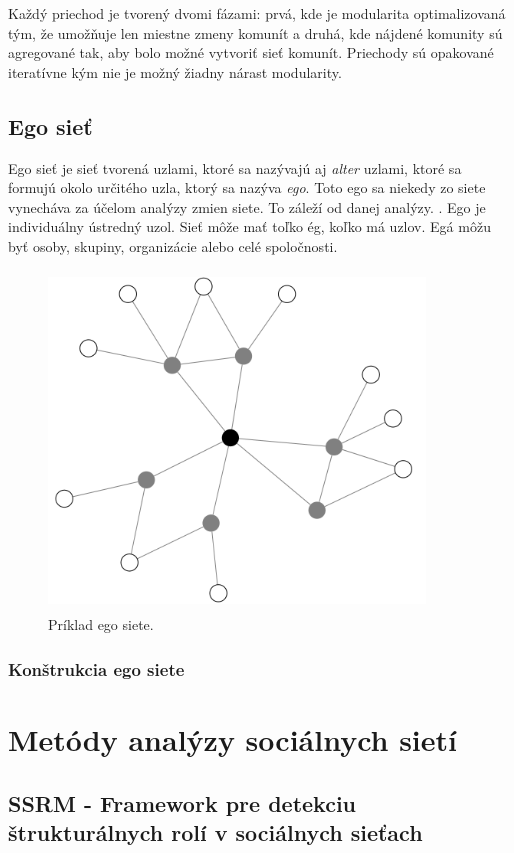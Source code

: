 \documentclass[slovak,master,public,dept460,male,cpdeclaration,oneside]{diploma}
\begin{document}
Každý priechod je tvorený dvomi fázami: prvá, kde je modularita optimalizovaná tým, že umožňuje len miestne zmeny komunít a druhá, kde nájdené komunity sú agregované tak, aby bolo možné vytvoriť sieť komunít. Priechody sú opakované iteratívne kým nie je možný žiadny nárast modularity.

\subsection{Ego sieť}

Ego sieť je sieť tvorená uzlami, ktoré sa nazývajú aj \textit{alter} uzlami, ktoré sa formujú okolo určitého uzla, ktorý sa nazýva \textit{ego}. Toto ego sa niekedy zo siete vynecháva za účelom analýzy zmien siete. To záleží od danej analýzy. \cite{21}. Ego je individuálny ústredný uzol. Sieť môže mať toľko ég, koľko má uzlov. Egá môžu byť osoby, skupiny, organizácie alebo celé spoločnosti.

\begin{figure}[H]
\centering
\includegraphics[width=10cm, height=9cm]{figures/egonet}
\caption{Príklad ego siete.}
\end{figure}

\subsubsection{Konštrukcia ego siete}


\section{Metódy analýzy sociálnych sietí}

\subsection{SSRM - Framework pre detekciu štrukturálnych rolí v sociálnych sieťach}
\end{document}
